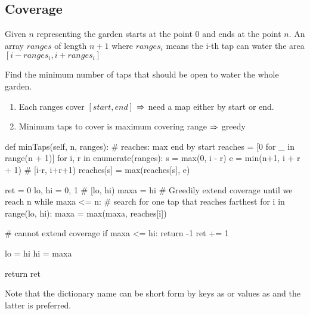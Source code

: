 \subsection{Coverage}
 Given $n$ representing the garden starts at the point 0 and ends at the point $n$. An array $ranges$ of length $n + 1$ where $ranges_i$  means the i-th tap can water the area $[i - ranges_i, i + ranges_i]$

Find the minimum number of taps that should be open to water the whole garden. 

\begin{enumerate}
\item Each ranges cover $[start, end]$ $\Rightarrow$ need a map either by start or end. 
\item Minimum taps to cover is maximum covering range $\Rightarrow$ greedy 
\end{enumerate}
\begin{python}
def minTaps(self, n, ranges):
  # reaches: max end by start
  reaches = [0 for _ in range(n + 1)]
  for i, r in enumerate(ranges):
    s = max(0, i - r)
    e = min(n+1, i + r + 1)  # [i-r, i+r+1)
    reaches[s] = max(reaches[s], e)

  ret = 0
  lo, hi = 0, 1 # [lo, hi)
  maxa = hi
  # Greedily extend coverage until we reach n
  while maxa <= n:
    # search for one tap that reaches farthest
    for i in range(lo, hi):
      maxa = max(maxa, reaches[i])

    # cannot extend coverage
    if maxa <= hi:
      return -1
    ret += 1

    lo = hi
    hi = maxa

  return ret
\end{python}

Note that the dictionary name can be short form by keys as  or values as  and the latter is preferred. 

